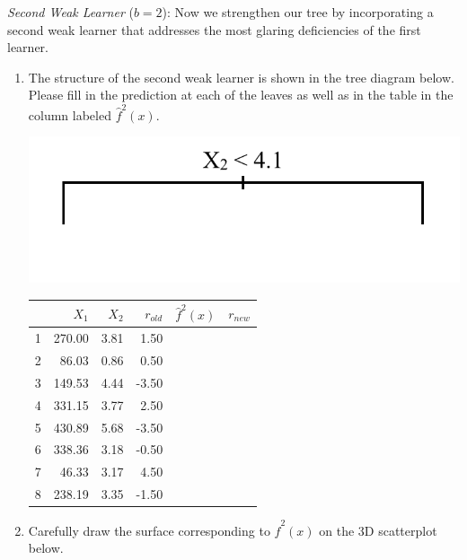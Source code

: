 \documentclass{article}\usepackage[]{graphicx}\usepackage[]{color}
\begin{document}
\emph{Second Weak Learner} ($b = 2$): Now we strengthen our tree by incorporating a second weak learner that addresses the most glaring deficiencies of the first learner.

\begin{enumerate}
\item The structure of the second weak learner is shown in the tree diagram below. Please fill in the prediction at each of the leaves as well as in the table in the column labeled $\hat{f}^2(x)$.

\vspace{10mm}

\begin{minipage}[t]{.4\textwidth}
{\includegraphics[width=\textwidth]{treeB.png}}
\end{minipage}
\hfill
\begin{minipage}[t]{.4\textwidth}
\begin{tabular}{rrrrll}
  \hline
 & $X_1$ & $X_2$ & $r_{old}$ & $\hat{f}^2(x)$ & $r_{new}$ \\ 
  \hline
1 & 270.00 & 3.81 & 1.50 &  &  \\ 
  2 & 86.03 & 0.86 & 0.50 &  &  \\ 
  3 & 149.53 & 4.44 & -3.50 &  &  \\ 
  4 & 331.15 & 3.77 & 2.50 &  &  \\ 
  5 & 430.89 & 5.68 & -3.50 &  &  \\ 
  6 & 338.36 & 3.18 & -0.50 &  &  \\ 
  7 & 46.33 & 3.17 & 4.50 &  &  \\ 
  8 & 238.19 & 3.35 & -1.50 &  &  \\ 
   \hline
\end{tabular}

\end{minipage}

\vspace{8mm}
\item Carefully draw the surface corresponding to $\hat{f}^2(x)$ on the 3D scatterplot below.


\end{enumerate}
\end{document}

